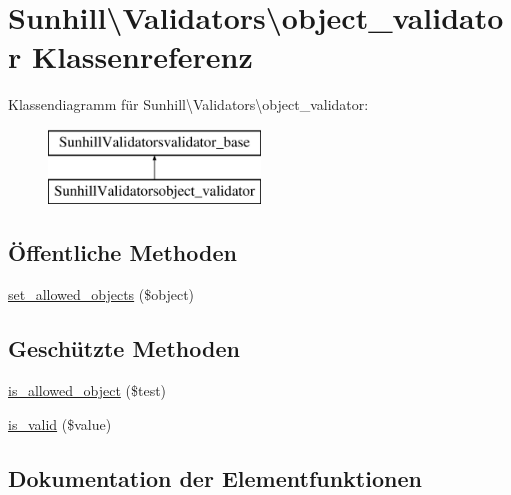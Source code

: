 \hypertarget{classSunhill_1_1Validators_1_1object__validator}{}\section{Sunhill\textbackslash{}Validators\textbackslash{}object\+\_\+validator Klassenreferenz}
\label{classSunhill_1_1Validators_1_1object__validator}
Klassendiagramm für Sunhill\textbackslash{}Validators\textbackslash{}object\+\_\+validator\+:\begin{figure}[H]
\begin{center}
\leavevmode
\includegraphics[height=2.000000cm]{d8/d98/classSunhill_1_1Validators_1_1object__validator}
\end{center}
\end{figure}
\subsection*{Öffentliche Methoden}
\begin{DoxyCompactItemize}
\item 
\hyperlink{classSunhill_1_1Validators_1_1object__validator_abf68d28d2cd57c903b193e593a5c5ccf}{set\+\_\+allowed\+\_\+objects} (\$object)
\end{DoxyCompactItemize}
\subsection*{Geschützte Methoden}
\begin{DoxyCompactItemize}
\item 
\hyperlink{classSunhill_1_1Validators_1_1object__validator_a32ff3b46d3ca4110103d6748a6db3d49}{is\+\_\+allowed\+\_\+object} (\$test)
\item 
\hyperlink{classSunhill_1_1Validators_1_1object__validator_a27d2216c25c6f60479af58c86dfec109}{is\+\_\+valid} (\$value)
\end{DoxyCompactItemize}


\subsection{Dokumentation der Elementfunktionen}
\mbox{\label{classSunhill_1_1Validators_1_1object__validator_a32ff3b46d3ca4110103d6748a6db3d49}} 
